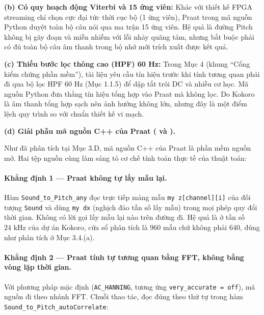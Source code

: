 \documentclass[11pt,a4paper]{article}
\begin{document}
\textbf{(b) Có quy hoạch động Viterbi và 15 ứng viên:}
Khác với thiết kế FPGA streaming chỉ chọn cực đại tức thời cục bộ (1 ứng viên), Praat trong mã nguồn Python duyệt toàn bộ câu nói qua ma trận 15 ứng viên. Hệ quả là đường Pitch không bị gãy đoạn và miễn nhiễm với lỗi nhảy quãng tám, nhưng bắt buộc phải có đủ toàn bộ câu âm thanh trong bộ nhớ mới trích xuất được kết quả.

\textbf{(c) Thiếu bước lọc thông cao (HPF) 60 Hz:}
Trong Mục 4 (khung ``Cổng kiểm chứng phần mềm''), tài liệu yêu cầu tín hiệu trước khi tính tương quan phải đi qua bộ lọc HPF 60 Hz (Mục 1.1.5) để dập tắt trôi DC và nhiễu cơ học. Mã nguồn Python đưa thẳng tín hiệu tổng hợp vào Praat mà không lọc. Do Kokoro là âm thanh tổng hợp sạch nên ảnh hưởng không lớn, nhưng đây là một điểm lệch quy trình so với chuẩn thiết kế vi mạch.

\textbf{(d) Giải phẫu mã nguồn C++ của Praat ( và ).}

Như đã phân tích tại Mục 3.D, mã nguồn C++ của Praat là phần mềm nguồn mở. Hai tệp nguồn  cùng  làm sáng tỏ cơ chế tính toán thực tế của thuật toán:

\paragraph{Khẳng định 1 --- Praat không tự lấy mẫu lại.}
Hàm \texttt{Sound\_to\_Pitch\_any} đọc trực tiếp mảng mẫu \texttt{my z[channel][i]} của đối tượng \texttt{Sound} và dùng \texttt{my dx} (nghịch đảo tần số lấy mẫu) trong mọi phép quy đổi thời gian. Không có lời gọi lấy mẫu lại nào trên đường đi. Hệ quả là ở tần số $24\text{ kHz}$ của dự án Kokoro, cửa sổ phân tích là $960$ mẫu chứ không phải $640$, đúng như phân tích ở Mục 3.4.(a).

\paragraph{Khẳng định 2 --- Praat tính tự tương quan bằng FFT, không bằng vòng lặp thời gian.}
Với phương pháp mặc định (\texttt{AC\_HANNING}, tương ứng \texttt{very\_accurate = off}), mã nguồn đi theo nhánh FFT. Chuỗi thao tác, đọc đúng theo thứ tự trong hàm \texttt{Sound\_to\_Pitch\_autoCorrelate}:
\end{document}
